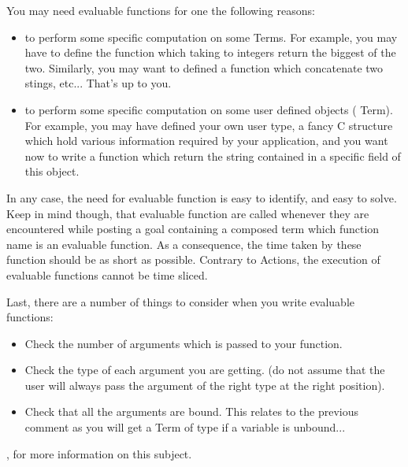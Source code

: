 You may need evaluable functions for one the following reasons:

\begin{itemize}

\item to perform some specific computation on some Terms. For example,
you may have to define the  function which taking to integers
return the biggest of the two. Similarly, you may want to defined a
function which concatenate two stings, etc... That's up to you.

\item to perform some specific computation on some user defined objects
( Term). For example, you may have defined your own user type, a
fancy C structure which hold various information required by your
application, and you want now to write a function which return the string
contained in a specific field of this object.

\end{itemize}

In any case, the need for evaluable function is easy to identify, and
easy to solve. Keep in mind though, that evaluable function are called
whenever they are encountered while posting a goal containing a composed
term which function name is an evaluable function. As a consequence, the
time taken by these function should be as short as possible. Contrary to
Actions, the execution of evaluable functions cannot be time sliced.

Last, there are a number of things to consider when you write evaluable
functions:

\begin{itemize}

\item Check the number of arguments which is passed to your function.

\item Check the type of each argument you are getting. (do not assume
that the user will always pass the argument of the right type at the
right position).

\item Check that all the arguments are bound. This relates to the previous
comment as you will get a Term of type  if a variable is
unbound...

\end{itemize}

, for more information
on this subject.

